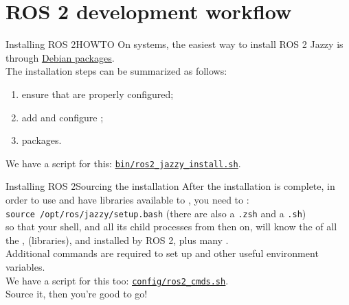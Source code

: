 
\section{ROS 2 development workflow}
\graphicspath{{figs/section1/}}

\begin{frame}{Installing ROS 2}{HOWTO}
  On  systems, the easiest way to install ROS 2 Jazzy is through \href{https://docs.ros.org/en/jazzy/Installation/Ubuntu-Install-Debians.html}{\color{blue}\underline{Debian packages}}.\\
  \bigskip
  The installation steps can be summarized as follows:
  \begin{enumerate}
    \item ensure that  are properly configured;
    \item add and configure ;
    \item {} packages.
  \end{enumerate}
  We have a script for this: \href{https://github.com/IntelligentSystemsLabUTV/ros2-examples/blob/jazzy/bin/ros2_jazzy_install.sh}{\color{blue}\underline{\texttt{bin/ros2\_jazzy\_install.sh}}}.
\end{frame}
\begin{frame}{Installing ROS 2}{Sourcing the installation}
  After the installation is complete, in order to use  and have libraries available to , you need to :\\
  \bigskip
  \texttt{source /opt/ros/jazzy/setup.bash} (there are also a \texttt{.zsh} and a \texttt{.sh})\\
  \bigskip
  so that your shell, and all its child processes from then on, will know the  of all the ,  (libraries), and  installed by ROS 2, plus many .\\
  \bigskip
  Additional commands are required to set up  and other useful environment variables.\\
  We have a script for this too: \href{https://github.com/IntelligentSystemsLabUTV/ros2-examples/blob/jazzy/config/ros2_cmds.sh}{\color{blue}\underline{\texttt{config/ros2\_cmds.sh}}}.\\
  Source it, then you're good to go!
\end{frame}

